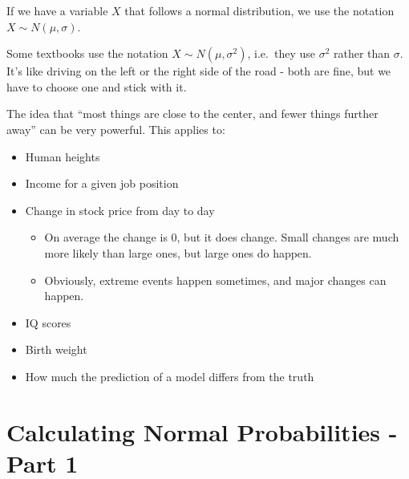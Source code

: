 \documentclass[
  letterpaper,
  DIV=11,
  numbers=noendperiod,
  oneside]{scrreprt}
\providecommand{\tightlist}{%
  \setlength{\itemsep}{0pt}\setlength{\parskip}{0pt}}\usepackage{longtable,booktabs,array}
\begin{document}
If we have a variable \(X\) that follows a normal distribution, we use
the notation \(X \sim N(\mu, \sigma)\).

\begin{tcolorbox}[enhanced jigsaw, toprule=.15mm, colbacktitle=quarto-callout-warning-color!10!white, title=\textcolor{quarto-callout-warning-color}{\faExclamationTriangle}\hspace{0.5em}{Warning}, arc=.35mm, colframe=quarto-callout-warning-color-frame, colback=white, titlerule=0mm, left=2mm, bottomtitle=1mm, bottomrule=.15mm, breakable, opacitybacktitle=0.6, leftrule=.75mm, toptitle=1mm, coltitle=black, rightrule=.15mm, opacityback=0]

Some textbooks use the notation \(X \sim N(\mu, \sigma^2)\), i.e.~they
use \(\sigma^2\) rather than \(\sigma\). It's like driving on the left
or the right side of the road - both are fine, but we have to choose one
and stick with it.

\end{tcolorbox}

The idea that ``most things are close to the center, and fewer things
further away'' can be very powerful. This applies to:

\begin{itemize}
\tightlist
\item
  Human heights
\item
  Income for a given job position
\item
  Change in stock price from day to day

  \begin{itemize}
  \tightlist
  \item
    On average the change is 0, but it does change. Small changes are
    much more likely than large ones, but large ones do happen.
  \item
    Obviously, extreme events happen sometimes, and major changes can
    happen.
  \end{itemize}
\item
  IQ scores
\item
  Birth weight
\item
  How much the prediction of a model differs from the truth
\end{itemize}

\hypertarget{calculating-normal-probabilities---part-1}{%
\section{Calculating Normal Probabilities - Part
1}\label{calculating-normal-probabilities---part-1}}
\end{document}
